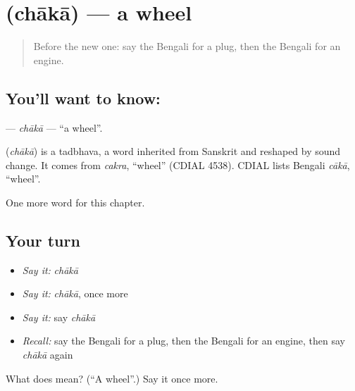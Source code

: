 \section[\texorpdfstring{\bn{চাকা} (chākā)}{চাকা (chākā)}]{ (chākā) — a wheel}

\label{lesson:BN-C174-chaka}



\begin{quote}
Before the new one: say the Bengali for a plug, then the Bengali for an engine.
\end{quote}

\subsection*{You'll want to know: }
\textbf{} — \emph{chākā} — \textquotedblleft{}a wheel\textquotedblright{}.

\begin{cousinweb}
\textbf{} (\emph{chākā}) is a tadbhava, a word inherited from Sanskrit and reshaped by sound change. It comes from \emph{cakra}, \textquotedblleft{}wheel\textquotedblright{} (CDIAL 4538). CDIAL lists Bengali \emph{cākā}, \textquotedblleft{}wheel\textquotedblright{}.
\end{cousinweb}

\begin{grammarlens}[title={What you've built}]
One more word for this chapter.
\end{grammarlens}

\subsection*{Your turn}
\begin{itemize}
\raggedright
  \item \emph{Say it:} \emph{chākā}
  \item \emph{Say it:} \emph{chākā}, once more
  \item \emph{Say it:} say \emph{chākā}
  \item \emph{Recall:} say the Bengali for a plug, then the Bengali for an engine, then say \emph{chākā} again
\end{itemize}

\begin{tcolorbox}[breakable,colback=teal!4,colframe=teal!35!black,title={Before you move on}]
What does  mean? (\textquotedblleft{}A wheel\textquotedblright{}.) Say it once more.
\end{tcolorbox}
